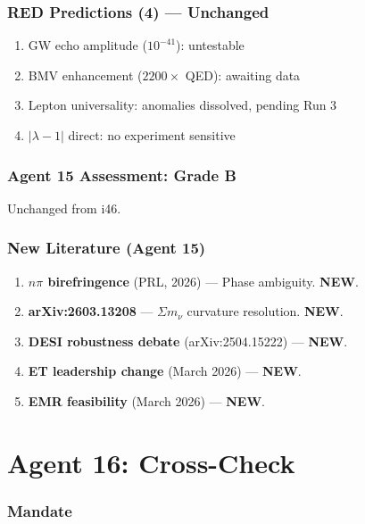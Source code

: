 \documentclass[11pt,a4paper]{article}
\newcommand{\NEW}{\textcolor{dfdblue}{\textbf{NEW}}}
\begin{document}
\section{RED Predictions (4) --- Unchanged}

\begin{enumerate}
\item GW echo amplitude ($10^{-41}$): untestable
\item BMV enhancement ($2200\times$ QED): awaiting data
\item Lepton universality: anomalies dissolved, pending Run 3
\item $|\lambda-1|$ direct: no experiment sensitive
\end{enumerate}

\section{Agent 15 Assessment: Grade B}

Unchanged from i46.

\section{New Literature (Agent 15)}

\begin{enumerate}
\item \textbf{$n\pi$ birefringence} (PRL, 2026) --- Phase ambiguity. \NEW.
\item \textbf{arXiv:2603.13208} --- $\Sigma m_\nu$ curvature resolution. \NEW.
\item \textbf{DESI robustness debate} (arXiv:2504.15222) --- \NEW.
\item \textbf{ET leadership change} (March 2026) --- \NEW.
\item \textbf{EMR feasibility} (March 2026) --- \NEW.
\end{enumerate}


\part{Agent 16: Cross-Check}
\label{part:agent16}

\section{Mandate}
\end{document}
